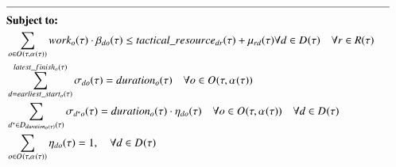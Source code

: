 \begin{alignat}{2}
	& \text{\rule{\linewidth}{0.4pt}} \notag\\
	& \textbf{Subject to:}                                                                                                                                                                                                                                                                 \notag\\
	& \sum_{\ElementOperation \in \SetOperation{}{\VarStrategicWorkOrderAssignment{}{}}} \ParOperationWork{\ElementOperation} \cdot \VarTacticalWork{\ElementDays}{\ElementOperation} \leq \ParTacticalResource + \VarTacticalExcess \forall \ElementDays \in \SetDays{} \quad \forall r \in \SetResource                                                                                                                                                                                                                 \\ 
	& \sum_{\ElementDays = \ParEarliestStart}^{\ParLatestFinish} \VarTacticalWorkBinary{\ElementDays}{\ElementOperation} = \ParDuration                                                                                                                                 \quad \forall \ElementOperation \in \SetOperation{}{\VarStrategicWorkOrderAssignment{}{}}                                                                                                                                                                                                  \\
	& \sum_{\ElementDays^* \in  \SetDays{\ParDuration}} \VarTacticalWorkBinary{\ElementDays^*}{\ElementOperation}                                                                                                                    = \ParDuration \cdot \VarTacticalWorkBinaryConsecutive                                                                                                                                                                                                        \quad \forall \ElementOperation \in \SetOperation{}{\VarStrategicWorkOrderAssignment{}{}} \quad \forall \ElementDays \in \SetDays{}                                                                                                                                                        \\
	& \sum_{\ElementOperation \in \SetOperation{}{\VarStrategicWorkOrderAssignment{}{}}} \VarTacticalWorkBinaryConsecutive = 1,                                                                                                                                         \quad \forall \ElementDays \in \SetDays{}                                                                                                                                                                                                                                            \notag\\

\end{alignat}
